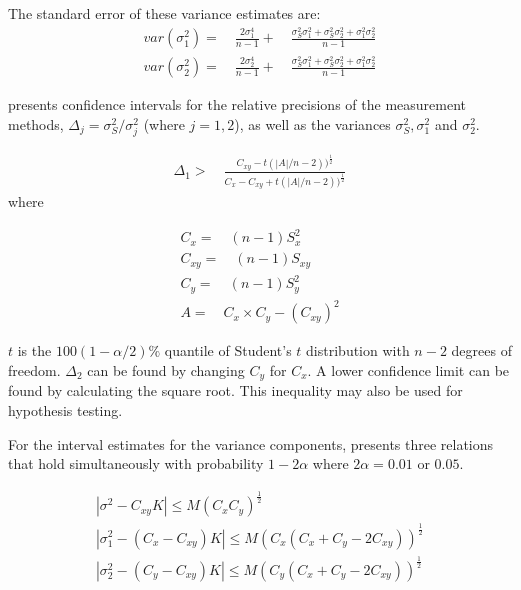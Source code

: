 \documentclass[12pt, a4paper]{report}
\theoremstyle{plain}
\theoremstyle{definition}
\theoremstyle{remark}
\begin{document}
	The standard error of these variance estimates are:
	\begin{eqnarray}
	var(\sigma^{2}_{1}) =\quad \frac{2\sigma^{4}_{1}}{n-1} +\quad
	\frac{\sigma^2_{S}\sigma^2_{1}+\sigma^2_{S}\sigma^2_{2}+\sigma^2_{1}\sigma^2_{2}
	}{n-1}\\
	var(\sigma^{2}_{2}) =\quad \frac{2\sigma^{4}_{2}}{n-1} +\quad
	\frac{\sigma^2_{S}\sigma^2_{1}+\sigma^2_{S}\sigma^2_{2}+\sigma^2_{1}\sigma^2_{2}
	}{n-1}\nonumber
	\end{eqnarray}
	
	\citet{Thompson}presents confidence intervals for the relative
	precisions of the measurement methods, $\Delta_{j}=
	\sigma^2_{S}/\sigma^2_{j}$ (where $j=1,2$), as well as the
	variances $\sigma^{2}_{S}, \sigma^{2}_{1}$ and $\sigma^{2}_{2}$.
	
	\begin{eqnarray}
	\Delta_{1} >\quad \frac{C_{xy}-
		t(|A|/n-2))^{\frac{1}{2}}}{C_{x}-C_{xy}+
		t(|A|/n-2))^{\frac{1}{2}}}
	\end{eqnarray}
	where
	
	\begin{eqnarray}
	C_{x}=\quad(n-1)S^2_{x}\nonumber\\
	C_{xy}=\quad(n-1)S_{xy}\nonumber\\
	C_{y}=\quad(n-1)S^2_{y}\nonumber\\
	A=\quad C_{x}\times C_{y} - (C_{xy})^2 \nonumber
	\end{eqnarray}
	
	$t$ is the $100(1-\alpha/2)\%$ quantile of Student's $t$
	distribution with $n-2$ degrees of freedom. $\Delta_{2}$ can be
	found by changing $C_{y}$ for $C_{x}$. A lower confidence limit
	can be found by calculating the square root. This inequality may
	also be used for hypothesis testing.
	
	For the interval estimates for the variance components,
	\citet{Thompson} presents three relations that hold simultaneously
	with probability $1-2\alpha$ where $2\alpha=0.01$ or $0.05$.
	
	\begin{eqnarray}
	|\sigma^2-C_{xy}K|\leqslant M(C_{x}C_{y})^{\frac{1}{2}}\\
	|\sigma^2_{1}-(C_{x}-C_{xy})K|\leqslant M(C_{x}(C_{x}+C_{y}-2C_{xy}))^{\frac{1}{2}}\nonumber\\
	|\sigma^2_{2}-(C_{y}-C_{xy})K|\leqslant
	M(C_{y}(C_{x}+C_{y}-2C_{xy}))^{\frac{1}{2}}\nonumber
	\end{eqnarray}
	
\end{document}
